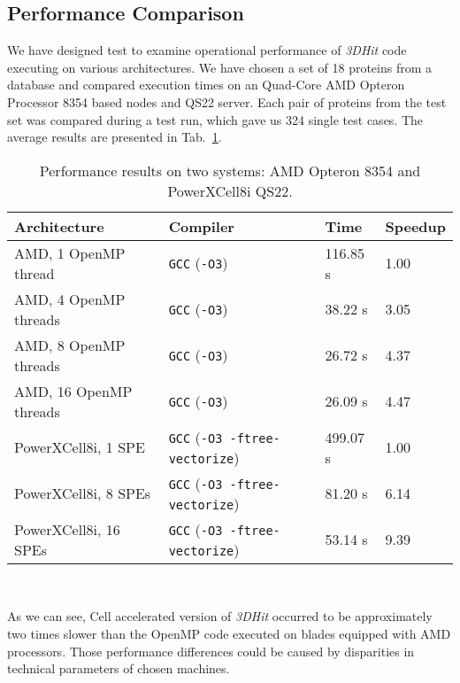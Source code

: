 \documentclass[envcountsame,envcountchap]{svmono}
\newcommand{\prog}{\emph{3DHit}}
\begin{document}
\subsection{Performance Comparison}

We have designed test to examine operational performance of \prog{} code
executing on various architectures.
We have chosen a set of 18 proteins from a database and compared execution times
on an Quad-Core AMD Opteron Processor 8354 based nodes and QS22 server.
Each pair of proteins from the test set was compared during a test run, which
gave us 324 single test cases.
The average results are presented in Tab.~\ref{tab:t4}.
\begin{table}[htb]
\begin{footnotesize}
\caption{Performance results on two systems: AMD Opteron 8354 and PowerXCell8i QS22.}
\label{tab:t4}
\newcommand{\m}{\hphantom{$-$}}
\newcommand{\cc}[1]{\multicolumn{1}{c}{#1}}
\renewcommand{\tabcolsep}{0.5pc} %
\renewcommand{\arraystretch}{1.2} %
\begin{tabular}{@{}llll}
\hline
\textbf{Architecture} & \textbf{Compiler} & \textbf{Time} & \textbf{Speedup} \\
\hline
AMD, 1 OpenMP thread & \texttt{GCC} (\texttt{-O3}) & 116.85 s & 1.00 \\
AMD, 4 OpenMP threads & \texttt{GCC} (\texttt{-O3}) & 38.22 s & 3.05 \\
AMD, 8 OpenMP threads & \texttt{GCC} (\texttt{-O3}) & 26.72 s & 4.37 \\
AMD, 16 OpenMP threads & \texttt{GCC} (\texttt{-O3}) & 26.09 s & 4.47 \\
\hline
PowerXCell8i, 1 SPE & \texttt{GCC} (\texttt{-O3 -ftree-vectorize}) & 499.07 s & 1.00 \\
PowerXCell8i, 8 SPEs & \texttt{GCC} (\texttt{-O3 -ftree-vectorize}) &  81.20 s & 6.14 \\
PowerXCell8i, 16 SPEs & \texttt{GCC} (\texttt{-O3 -ftree-vectorize}) & 53.14 s & 9.39 \\
\hline
\end{tabular}\\[2pt]
\end{footnotesize}
\end{table}
As we can see, Cell accelerated version of \prog{} occurred to be approximately
two times slower than the OpenMP code executed on blades equipped with AMD
processors.
Those performance differences could be caused by disparities in technical
parameters of chosen machines.
\end{document}
